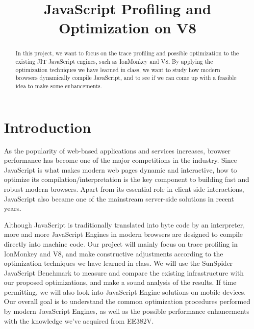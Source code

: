 \documentclass[conference]{IEEEtran}
\begin{document}
\title{JavaScript Profiling and Optimization on V8}

\author{
\and
{}
}

\maketitle

\begin{abstract}
In this project, we want to focus on the trace profiling and possible optimization to the existing JIT JavaScript engines, such as IonMonkey and V8. By applying the optimization techniques we have learned in class, we want to study how modern browsers dynamically compile JavaScript, and to see if we can come up with a feasible idea to make some enhancements.

\end{abstract}

\section{Introduction}
As the popularity of web-based applications and services increases, browser performance has become one of the major competitions in the industry. Since JavaScript is what makes modern web pages dynamic and interactive, how to optimize its compilation/interpretation is the key component to building fast and robust modern browsers. Apart from its essential role in client-side interactions, JavaScript also became one of the mainstream server-side solutions in recent years\cite{node}. 

Although JavaScript is traditionally translated into byte code by an interpreter, more and more JavaScript Engines in modern browsers  are designed to compile directly into machine code. Our project will mainly focus on trace profiling\cite{Trace} in IonMonkey and V8, and make constructive adjustments according to the optimization techniques we have learned in class. We will use the SunSpider JavaScript Benchmark to measure and compare the existing infrastructure with our proposed optimizations, and make a sound analysis of the results. If time permitting, we will also look into JavaScript Engine solutions on mobile devices. Our overall goal is to understand the common optimization procedures performed by modern JavaScript Engines, as well as the possible performance enhancements with the knowledge we've acquired from EE382V. 
\end{document}
